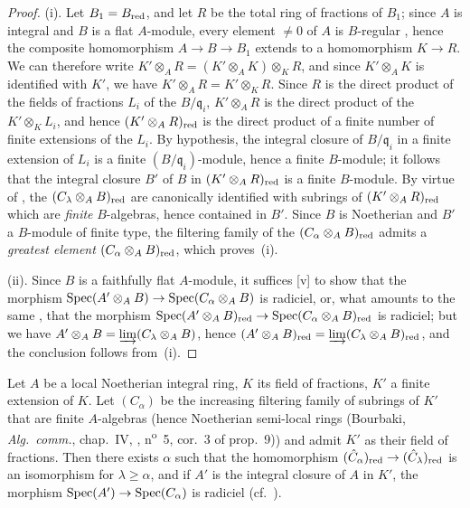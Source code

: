 \begin{proof}
\medskip\noindent
(i).
Let $B_1=B_{\mathrm{red}}$, and let $R$ be the total ring of fractions of $B_1$; since $A$ is integral and $B$ is a flat $A$-module, every element $\neq 0$ of $A$ is $B$-regular , hence the composite homomorphism $A\to B\to B_1$ extends to a homomorphism $K\to R$. We can therefore write $K'\otimes_A R=(K'\otimes_A K)\otimes_K R$, and since $K'\otimes_A K$ is identified with $K'$, we have $K'\otimes_A R=K'\otimes_K R$. Since $R$ is the direct product of the fields of fractions $L_i$ of the $B/\mathfrak{q}_i$, $K'\otimes_A R$ is the direct product of the $K'\otimes_K L_i$, and hence $(K'\otimes_A R)_{\mathrm{red}}$ is the direct product of a finite number of finite extensions of the $L_i$. By hypothesis, the integral closure of $B/\mathfrak{q}_i$ in a finite extension of $L_i$ is a finite $(B/\mathfrak{q}_i)$-module, hence a finite $B$-module; it follows that the integral closure $B'$ of $B$ in $(K'\otimes_A R)_{\mathrm{red}}$ is a finite $B$-module.
By virtue of , the $(C_\lambda\otimes_A B)_{\mathrm{red}}$ are canonically identified with subrings of $(K'\otimes_A R)_{\mathrm{red}}$ which are \emph{finite} $B$-algebras, hence contained in $B'$.
Since $B$ is Noetherian and $B'$ a $B$-module of finite type, the filtering family of the $(C_\alpha\otimes_A B)_{\mathrm{red}}$ admits a \emph{greatest element} $(C_\alpha\otimes_A B)_{\mathrm{red}}$, which proves~(i).

\medskip\noindent
(ii).
Since $B$ is a faithfully flat $A$-module, it suffices [v] to show that the morphism $\operatorname{Spec}(A'\otimes_A B)\to\operatorname{Spec}(C_\alpha\otimes_A B)$ is radiciel, or, what amounts to the same , that the morphism $\operatorname{Spec}(A'\otimes_A B)_{\mathrm{red}}\to\operatorname{Spec}(C_\alpha\otimes_A B)_{\mathrm{red}}$ is radiciel; but we have $A'\otimes_A B=\varinjlim(C_\lambda\otimes_A B)$, hence  $(A'\otimes_A B)_{\mathrm{red}}=\varinjlim(C_\lambda\otimes_A B)_{\mathrm{red}}$, and the conclusion follows from~(i).
\end{proof}

\begin{corollary}[23.2.5]
\label{0.23.2.5}
Let $A$ be a local Noetherian integral ring, $K$ its field of fractions, $K'$ a finite extension of $K$.
Let $(C_\alpha)$ be the increasing filtering family of subrings of $K'$ that are finite $A$-algebras (hence Noetherian semi-local rings \textnormal{(Bourbaki, \emph{Alg.~comm.}, chap.~IV, , n\textsuperscript{o}~5, cor.~3 of prop.~9)}) and admit $K'$ as their field of fractions.
Then there exists $\alpha$ such that the homomorphism $(\hat{C}_\alpha)_{\mathrm{red}}\to(\hat{C}_\lambda)_{\mathrm{red}}$ is an isomorphism for $\lambda\geq\alpha$, and if $A'$ is the integral closure of $A$ in $K'$, the morphism $\operatorname{Spec}(A')\to\operatorname{Spec}(C_\alpha)$ is radiciel \textnormal{(cf.~)}.
\end{corollary}

